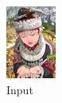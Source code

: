\documentclass[12pt,a4paper]{article}
\begin{document}
        \begin{figure}[H]
            \centering
            \begin{subfigure}{0.2\textwidth}
                \includegraphics[width=\textwidth]{images/samples/img-4-input.png}
                \caption*{Input}
            \end{subfigure}
            \enspace
            \begin{subfigure}{0.2\textwidth}

\end{subfigure}
\end{figure}
\end{document}
